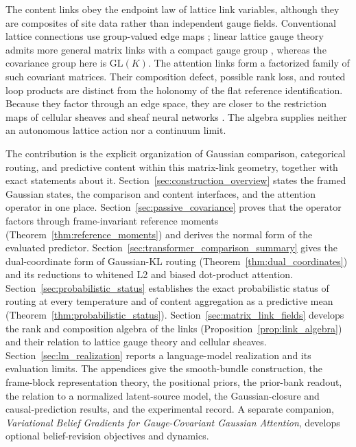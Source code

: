 \documentclass[twoside,11pt]{article}
\begin{document}
The content links obey the endpoint law of lattice link variables, although they are composites of site data rather than independent gauge fields. Conventional lattice connections use group-valued edge maps \citep{WilsonConfinement1974}; linear lattice gauge theory admits more general matrix links with a compact gauge group \citep{Wetterich2014LinearLattice}, whereas the covariance group here is $\mathrm{GL}(K)$. The attention links form a factorized family of such covariant matrices. Their composition defect, possible rank loss, and routed loop products are distinct from the holonomy of the flat reference identification. Because they factor through an edge space, they are closer to the restriction maps of cellular sheaves and sheaf neural networks \citep{HansenGhrist2019,Bodnar2022NeuralSheaf}. The algebra supplies neither an autonomous lattice action nor a continuum limit.

The contribution is the explicit organization of Gaussian comparison, categorical routing, and predictive content within this matrix-link geometry, together with exact statements about it. Section~\ref{sec:construction_overview} states the framed Gaussian states, the comparison and content interfaces, and the attention operator in one place. Section~\ref{sec:passive_covariance} proves that the operator factors through frame-invariant reference moments (Theorem~\ref{thm:reference_moments}) and derives the normal form of the evaluated predictor. Section~\ref{sec:transformer_comparison_summary} gives the dual-coordinate form of Gaussian-KL routing (Theorem~\ref{thm:dual_coordinates}) and its reductions to whitened L2 and biased dot-product attention. Section~\ref{sec:probabilistic_status} establishes the exact probabilistic status of routing at every temperature and of content aggregation as a predictive mean (Theorem~\ref{thm:probabilistic_status}). Section~\ref{sec:matrix_link_fields} develops the rank and composition algebra of the links (Proposition~\ref{prop:link_algebra}) and their relation to lattice gauge theory and cellular sheaves. Section~\ref{sec:lm_realization} reports a language-model realization and its evaluation limits. The appendices give the smooth-bundle construction, the frame-block representation theory, the positional priors, the prior-bank readout, the relation to a normalized latent-source model, the Gaussian-closure and causal-prediction results, and the experimental record. A separate companion, \emph{Variational Belief Gradients for Gauge-Covariant Gaussian Attention}, develops optional belief-revision objectives and dynamics.
\end{document}
